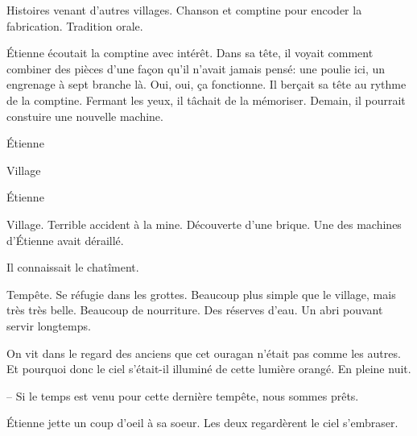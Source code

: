 Histoires venant d'autres villages. Chanson et comptine pour encoder la fabrication. 
Tradition orale.

Étienne écoutait la comptine avec intérêt. Dans sa tête, il voyait comment combiner des pièces d'une
façon qu'il n'avait jamais pensé: une poulie ici, un engrenage à sept branche là. Oui, oui, ça fonctionne.
Il berçait sa tête au rythme de la comptine. Fermant les yeux, il tâchait de la mémoriser.
Demain, il pourrait constuire une nouvelle machine.

\sautSection{}

Étienne 

\sautSection{}

Village 

\sautSection{}

Étienne

\sautSection{}

Village. Terrible accident à la mine. Découverte d'une brique.
Une des machines d'Étienne avait déraillé.

Il connaissait le chatîment.

\sautSection{}


Tempête. Se réfugie dans les grottes. Beaucoup plus simple que le village, mais très très belle.
Beaucoup de nourriture. Des réserves d'eau. Un abri pouvant servir longtemps.


On vit dans le regard des anciens que cet ouragan n'était pas comme les autres.
Et pourquoi donc le ciel s'était-il illuminé de cette lumière orangé. En pleine nuit.

-- Si le temps est venu pour cette dernière tempête, nous sommes prêts.

Étienne jette un coup d'oeil à sa soeur. Les deux regardèrent le ciel s'embraser.
